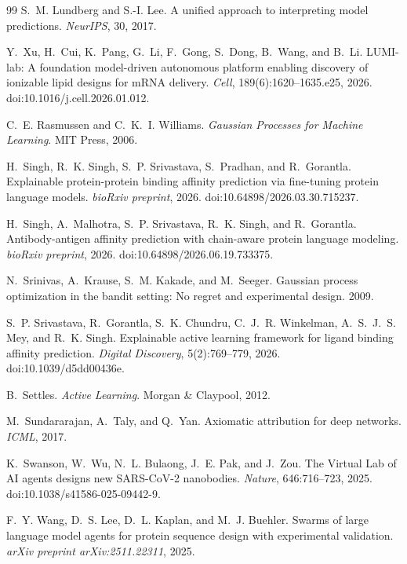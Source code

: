 \begin{thebibliography}{99}
S.~M. Lundberg and S.-I. Lee.
A unified approach to interpreting model predictions.
\emph{NeurIPS}, 30, 2017.

Y.~Xu, H.~Cui, K.~Pang, G.~Li, F.~Gong, S.~Dong, B.~Wang, and B.~Li.
LUMI-lab: A foundation model-driven autonomous platform enabling discovery of ionizable lipid designs for mRNA delivery.
\emph{Cell}, 189(6):1620--1635.e25, 2026. doi:10.1016/j.cell.2026.01.012.

C.~E. Rasmussen and C.~K.~I. Williams.
\emph{Gaussian Processes for Machine Learning}. MIT Press, 2006.

H.~Singh, R.~K. Singh, S.~P. Srivastava, S.~Pradhan, and R.~Gorantla.
Explainable protein-protein binding affinity prediction via fine-tuning protein language models.
\emph{bioRxiv preprint}, 2026.
doi:10.64898/2026.03.30.715237.

H.~Singh, A.~Malhotra, S.~P. Srivastava, R.~K. Singh, and R.~Gorantla.
Antibody-antigen affinity prediction with chain-aware protein language modeling.
\emph{bioRxiv preprint}, 2026.
doi:10.64898/2026.06.19.733375.

N.~Srinivas, A.~Krause, S.~M. Kakade, and M.~Seeger.
Gaussian process optimization in the bandit setting: No regret and experimental design. 2009.

S.~P. Srivastava, R.~Gorantla, S.~K. Chundru, C.~J.~R. Winkelman, A.~S.~J.~S. Mey, and R.~K. Singh.
Explainable active learning framework for ligand binding affinity prediction.
\emph{Digital Discovery}, 5(2):769--779, 2026.
doi:10.1039/d5dd00436e.

B.~Settles. \emph{Active Learning}. Morgan \& Claypool, 2012.

M.~Sundararajan, A.~Taly, and Q.~Yan.
Axiomatic attribution for deep networks. \emph{ICML}, 2017.

K.~Swanson, W.~Wu, N.~L. Bulaong, J.~E. Pak, and J.~Zou.
The Virtual Lab of AI agents designs new SARS-CoV-2 nanobodies.
\emph{Nature}, 646:716--723, 2025. doi:10.1038/s41586-025-09442-9.

F.~Y. Wang, D.~S. Lee, D.~L. Kaplan, and M.~J. Buehler.
Swarms of large language model agents for protein sequence design with experimental validation.
\emph{arXiv preprint arXiv:2511.22311}, 2025.


\end{thebibliography}
